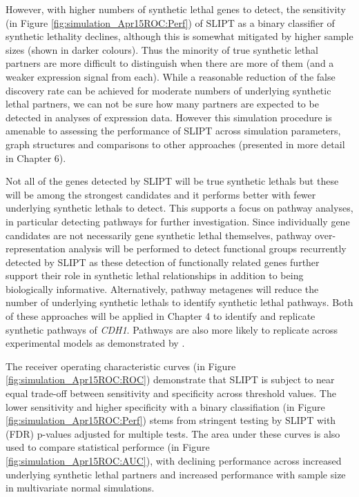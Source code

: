 However, with higher numbers of synthetic lethal genes to detect, the sensitivity (in Figure \ref{fig:simulation_Apr15ROC:Perf}) of SLIPT as a binary classifier of synthetic lethality declines, although this is somewhat mitigated by higher sample sizes (shown in darker colours). Thus the minority of true synthetic lethal partners are more difficult to distinguish when there are more of them (and a weaker expression signal from each). While a reasonable reduction of the false discovery rate can be achieved for moderate numbers of underlying synthetic lethal partners, we can not be sure how many partners are expected to be detected in analyses of expression data. However this simulation procedure is amenable to assessing the performance of SLIPT across simulation parameters, graph structures and comparisons to other approaches (presented in more detail in Chapter 6).

Not all of the genes detected by SLIPT will be true synthetic lethals but these will be among the strongest candidates and it performs better with fewer underlying synthetic lethals to detect. This supports a focus on pathway analyses, in particular detecting pathways for further investigation. Since individually gene candidates are not necessarily gene synthetic lethal themselves, pathway over-representation analysis will be performed to detect functional groups recurrently detected by SLIPT as these detection of functionally related genes further support their role in synthetic lethal relationships in addition to being biologically informative. Alternatively, pathway metagenes will reduce the number of underlying synthetic lethals to identify synthetic lethal pathways. Both of these approaches will be applied in Chapter 4 to identify and replicate synthetic pathways of \textit{CDH1}. Pathways are also more likely to replicate across experimental models as demonstrated by \citet{Dixon2008}.
 
The receiver operating characteristic curves (in Figure \ref{fig:simulation_Apr15ROC:ROC}) demonstrate that SLIPT is subject to near equal trade-off between sensitivity and specificity across threshold values. The lower sensitivity and higher specificity with a binary classifiation (in Figure \ref{fig:simulation_Apr15ROC:Perf}) stems from stringent testing by SLIPT with (FDR) p-values adjusted for multiple tests. The area under these curves is also used to compare statistical performce (in Figure \ref{fig:simulation_Apr15ROC:AUC}), with declining performance across increased underlying synthetic lethal partners and increased performance with sample size in multivariate normal simulations.

